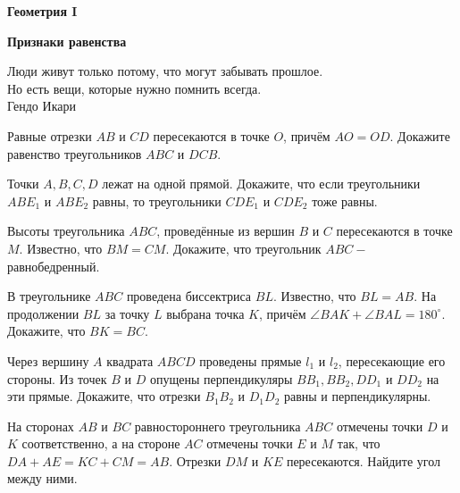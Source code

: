 \centerline{\bf \Huge Геометрия I}
\centerline{\bf \Huge Признаки равенства}

\begin{flushright}
        \scriptsize{Люди живут только потому, что могут забывать прошлое.\\ Но есть вещи, которые нужно помнить всегда.\\Гендо Икари}
\end{flushright}

Равные отрезки $A B$ и $C D$ пересекаются в точке $O$, причём $A O=O D$. Докажите равенство треугольников $A B C$ и $D C B$.

Точки $A, B, C, D$ лежат на одной прямой. Докажите, что если треугольники $A B E_1$ и $A B E_2$ равны, то треугольники $C D E_1$ и $C D E_2$ тоже равны.

Высоты треугольника $A B C$, проведённые из вершин $B$ и $C$ пересекаются в точке $M$. Известно, что $B M=C M$. Докажите, что треугольник $A B C-$ равнобедренный.

В треугольнике $A B C$ проведена биссектриса $B L$. Известно, что $B L=A B$. На продолжении $B L$ за точку $L$ выбрана точка $K$, причём $\angle B A K+\angle B A L=180^{\circ}$. Докажите, что $B K=B C$.

Через вершину $A$ квадрата $A B C D$ проведены прямые $l_1$ и $l_2$, пересекающие его стороны. Из точек $B$ и $D$ опущены перпендикуляры $B B_1, B B_2, D D_1$ и $D D_2$ на эти прямые. Докажите, что отрезки $B_1 B_2$ и $D_1 D_2$ равны и перпендикулярны.

На сторонах $A B$ и $B C$ равностороннего треугольника $A B C$ отмечены точки $D$ и $K$ соответственно, а на стороне $A C$ отмечены точки $E$ и $M$ так, что $D A+A E=K C+C M=A B$. Отрезки $D M$ и $K E$ пересекаются. Найдите угол между ними.